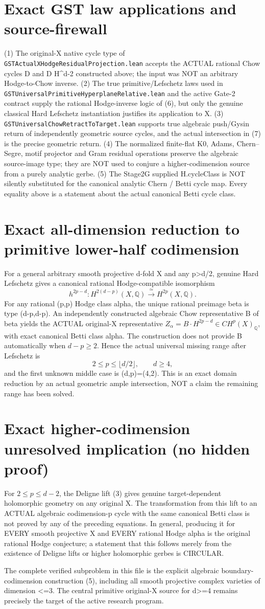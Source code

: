 \documentclass[11pt]{article}
\newcommand{\Q}{\mathbb Q}
\begin{document}
\section{Exact GST law applications and source-firewall}
(1) The original-X native cycle type of
\texttt{GSTActualXHodgeResidualProjection.lean}
accepts the ACTUAL rational Chow cycles D and
D H^{d-2} constructed above; the input was
NOT an arbitrary Hodge-to-Chow inverse.
(2) The true primitive/Lefschetz laws used in
\texttt{GSTUniversalPrimitiveHyperplaneRelative.lean}
and the active Gate-2 contract supply the
rational Hodge-inverse logic of (6), but
only the genuine classical Hard Lefschetz
instantiation justifies its application to X.
(3) \texttt{GSTUniversalChowRetractToTarget.lean}
supports true algebraic push/Gysin return of
independently geometric source cycles, and
the actual intersection in (7) is the
precise geometric return.
(4) The normalized finite-flat K0,
Adams, Chern--Segre, motif projector and
Gram residual operations preserve the
algebraic source-image type; they are NOT
used to conjure a higher-codimension
source from a purely analytic gerbe.
(5) The Stage2G supplied H.cycleClass
is NOT silently substituted for the
canonical analytic Chern / Betti cycle map.
Every equality above is a statement about
the actual canonical Betti cycle class.


\section{Exact all-dimension reduction to primitive lower-half codimension}
For a general arbitrary smooth projective d-fold X and any p>d/2,
genuine Hard Lefschetz gives a canonical rational Hodge-compatible
isomorphism
\[
 h^{2p-d}:H^{2(d-p)}(X,\Q)
                   \xrightarrow{\ \simeq\ }H^{2p}(X,\Q).
\]
For any rational (p,p) Hodge class alpha, the unique rational
preimage beta is type (d-p,d-p). An independently constructed
algebraic Chow representative B of beta yields the ACTUAL
original-X representative
\(Z_\alpha=B\cdot H^{2p-d}\in CH^p(X)_\Q\),
with exact canonical Betti class alpha.
The construction does not provide B automatically when
\(d-p\ge2\). Hence the actual universal missing range after
Lefschetz is
\[
 \boxed{2\le p\le\lfloor d/2\rfloor,\qquad d\ge4,}
\]
and the first unknown middle case is (d,p)=(4,2).
This is an exact domain reduction by an actual geometric ample
intersection, NOT a claim the remaining range has been solved.

\section{Exact higher-codimension unresolved implication (no hidden proof)}
For \(2\le p\le d-2\), the Deligne lift (3)
gives genuine target-dependent holomorphic
geometry on any original X. The transformation
from this lift to an ACTUAL algebraic codimension-p
cycle with the same canonical Betti class
is not proved by any of the preceding equations.
In general, producing it for EVERY smooth
projective X and EVERY rational Hodge alpha
is the original rational Hodge conjecture;
a statement that this follows merely from
the existence of Deligne lifts or higher
holomorphic gerbes is CIRCULAR.

The complete verified subproblem in this file
is the explicit algebraic boundary-codimension
construction (5), including all smooth projective
complex varieties of dimension <=3.
The central primitive original-X source
for d>=4 remains precisely the target
of the active research program.
\end{document}
